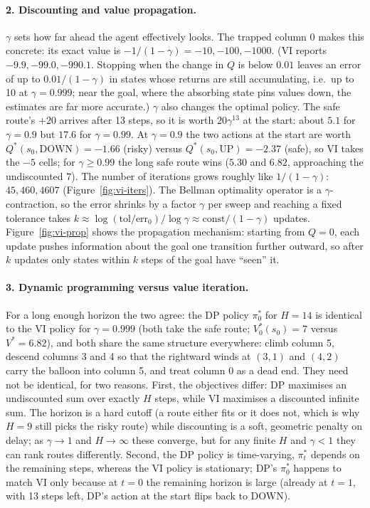\documentclass[11pt,letterpaper]{article}
\begin{document}
\paragraph{2. Discounting and value propagation.}
$\gamma$ sets how far ahead the agent effectively looks. The trapped
column 0 makes this concrete: its exact value is
$-1/(1-\gamma) = -10, -100, -1000$. (VI reports $-9.9, -99.0, -990.1$.
Stopping when the change in $Q$ is below $0.01$ leaves an error of up to
$0.01/(1-\gamma)$ in states whose returns are still accumulating, i.e.\ up
to 10 at $\gamma = 0.999$; near the goal, where the absorbing state pins
values down, the estimates are far more accurate.) $\gamma$ also changes
the optimal policy. The safe route's $+20$ arrives after 13 steps, so it
is worth $20\gamma^{13}$ at the start: about $5.1$ for $\gamma = 0.9$ but
$17.6$ for $\gamma = 0.99$. At $\gamma = 0.9$ the two actions at the start
are worth $Q^*(s_0,\text{DOWN}) = -1.66$ (risky) versus
$Q^*(s_0,\text{UP}) = -2.37$ (safe), so VI takes the $-5$ cells; for
$\gamma \ge 0.99$ the long safe route wins ($5.30$ and $6.82$, approaching
the undiscounted $7$). The number of iterations grows roughly like
$1/(1-\gamma)$: $45, 460, 4607$ (Figure~\ref{fig:vi-iters}). The Bellman
optimality operator is a $\gamma$-contraction, so the error shrinks by a
factor $\gamma$ per sweep and reaching a fixed tolerance takes
$k \approx \log(\mathrm{tol}/\mathrm{err}_0)/\log\gamma \approx
\mathrm{const}/(1-\gamma)$ updates. Figure~\ref{fig:vi-prop} shows the
propagation mechanism: starting from $Q=0$, each update pushes information
about the goal one transition further outward, so after $k$ updates only
states within $k$ steps of the goal have ``seen'' it.

\paragraph{3. Dynamic programming versus value iteration.}
For a long enough horizon the two agree: the DP policy $\pi^*_0$ for
$H=14$ is identical to the VI policy for $\gamma = 0.999$ (both take the
safe route; $V^*_0(s_0) = 7$ versus $V^* = 6.82$), and both share the same
structure everywhere: climb column 5, descend columns 3 and 4 so that the
rightward winds at $(3,1)$ and $(4,2)$ carry the balloon into column 5,
and treat column 0 as a dead end. They need not be identical, for two
reasons. First, the objectives differ: DP maximises an undiscounted sum
over exactly $H$ steps, while VI maximises a discounted infinite sum. The
horizon is a hard cutoff (a route either fits or it does not, which is why
$H=9$ still picks the risky route) while discounting is a soft, geometric
penalty on delay; as $\gamma \to 1$ and $H \to \infty$ these converge, but
for any finite $H$ and $\gamma < 1$ they can rank routes differently.
Second, the DP policy is time-varying, $\pi^*_t$ depends on the remaining
steps, whereas the VI policy is stationary; DP's $\pi^*_0$ happens to
match VI only because at $t=0$ the remaining horizon is large (already at
$t=1$, with 13 steps left, DP's action at the start flips back to DOWN).
\end{document}

